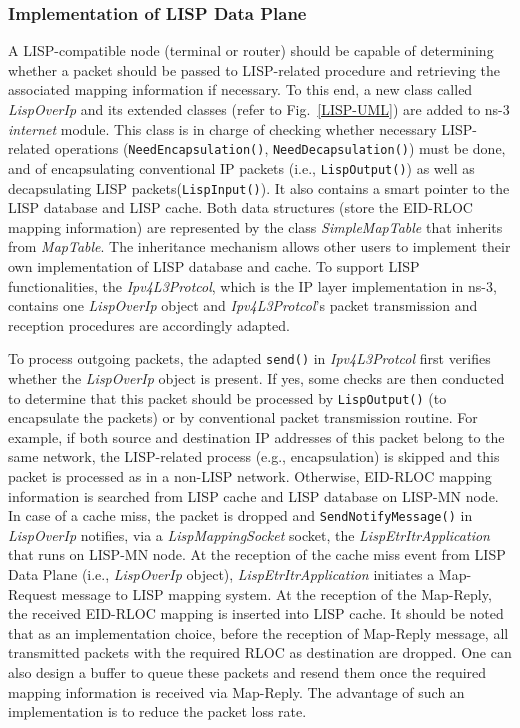 \subsubsection{Implementation of LISP Data Plane}\label{subsec:modifyInternet}
A LISP-compatible node (terminal or router) should be capable of determining
whether a packet should be passed to LISP-related procedure and retrieving the
associated mapping information if necessary. To this end, a new class called
\emph{LispOverIp} and its extended classes (refer to Fig.~\ref{LISP-UML}) are
added to ns-3 \emph{internet} module. This class is in charge of checking
whether necessary LISP-related operations (\texttt{NeedEncapsulation()},
\texttt{NeedDecapsulation()}) must be done, and of encapsulating conventional IP
packets (i.e., \texttt{LispOutput()}) as well as decapsulating LISP
packets(\texttt{LispInput()}). It also contains a smart pointer to the
LISP database and LISP cache.
Both data structures (store the EID-RLOC mapping information) are represented by
the class \emph{SimpleMapTable} that inherits from \emph{MapTable}. The
inheritance mechanism allows other users to implement their own implementation
of LISP database and cache. To support LISP functionalities, the \emph{Ipv4L3Protcol},
which is the IP layer implementation in ns-3, contains one \emph{LispOverIp}
object and \emph{Ipv4L3Protcol}'s packet transmission and reception procedures
are accordingly adapted.

To process outgoing packets, the adapted \texttt{send()} in \emph{Ipv4L3Protcol}
first verifies whether the \emph{LispOverIp} object is present. If yes, some
checks are then conducted to determine that this packet should be processed by
\texttt{LispOutput()} (to encapsulate the packets) or by conventional packet
transmission routine. For example, if both source and destination IP addresses
of this packet belong to the same network, the LISP-related process (e.g.,
encapsulation) is skipped and this packet is processed as in a non-LISP network.
Otherwise, EID-RLOC mapping information is searched from LISP cache and LISP
database on LISP-MN node. In case of a cache miss, the packet is dropped and
\texttt{SendNotifyMessage()} in \emph{LispOverIp} notifies, via a
\emph{LispMappingSocket} socket, the \emph{LispEtrItrApplication} that runs on
LISP-MN node. At the reception of the cache miss event from LISP Data Plane
(i.e., \emph{LispOverIp} object), \emph{LispEtrItrApplication} initiates a
Map-Request message to LISP mapping system. At the reception of the Map-Reply,
the received EID-RLOC mapping is inserted into LISP cache. It should be noted
that as an implementation choice, before the reception of Map-Reply message, all
transmitted packets with the required RLOC as destination are dropped. One can
also design a buffer to queue these packets and resend them once the required
mapping information is received via Map-Reply.
The advantage of such an implementation is to reduce the packet loss rate.

